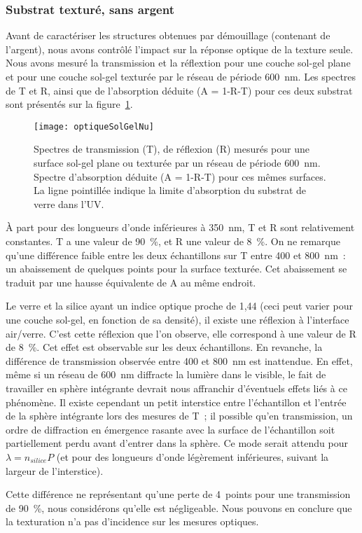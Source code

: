 	\subsubsection{Substrat texturé, sans argent}
Avant de caractériser les structures obtenues par démouillage (contenant de l'argent), nous avons contrôlé l'impact sur la réponse optique de la texture seule. Nous avons mesuré la transmission et la réflextion pour une couche sol-gel plane et pour une couche sol-gel texturée par le réseau de période 600~nm. Les spectres de T et R, ainsi que de l'absorption déduite (A = 1-R-T) pour ces deux substrat sont présentés sur la figure~\ref{optiqueSolGelNu}.\par 
\begin{figure}[!htb]
\centering
\texttt{[image: optiqueSolGelNu]}
\caption{Spectres de transmission (T), de réflexion (R) mesurés pour une surface sol-gel plane ou texturée par un réseau de période 600~nm. Spectre d'absorption déduite (A = 1-R-T) pour ces mêmes surfaces. La ligne pointillée indique la limite d'absorption du substrat de verre dans l'UV.}
\label{optiqueSolGelNu}
\end{figure}
À part pour des longueurs d'onde inférieures à 350~nm, T et R sont relativement constantes. T a une valeur de 90~\%, et R une valeur de 8~\%. On ne remarque qu'une différence faible entre les deux échantillons sur T entre 400 et 800~nm~: un abaissement de quelques points pour la surface texturée. Cet abaissement se traduit par une hausse équivalente de A au même endroit.\par 
Le verre et la silice ayant un indice optique proche de 1,44 (ceci peut varier pour une couche sol-gel, en fonction de sa densité), il existe une réflexion à l'interface air/verre. C'est cette réflexion que l'on observe, elle correspond à une valeur de R de 8~\%. Cet effet est observable sur les deux échantillons. En revanche, la différence de transmission observée entre 400 et 800~nm est inattendue. En effet, même si un réseau de 600~nm diffracte la lumière dans le visible, le fait de travailler en sphère intégrante devrait nous affranchir d'éventuels effets liés à ce phénomène. Il existe cependant un petit interstice entre l'échantillon et l'entrée de la sphère intégrante lors des mesures de T~; il possible qu'en transmission, un ordre de diffraction en émergence rasante avec la surface de l'échantillon soit partiellement perdu avant d'entrer dans la sphère. Ce mode serait attendu pour $\lambda = n_{silice}P$ (et pour des longueurs d'onde légèrement inférieures, suivant la largeur de l'interstice).\par 
Cette différence ne représentant qu'une perte de 4~points pour une transmission de 90~\%, nous considérons qu'elle est négligeable. Nous pouvons en conclure que la texturation n'a pas d'incidence sur les mesures optiques.\par 

